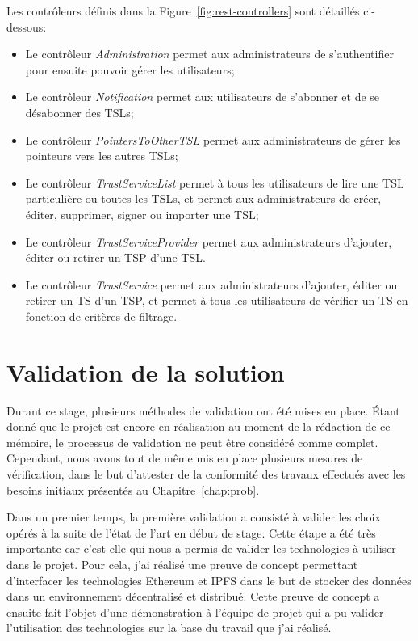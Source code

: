 \documentclass{tnreport}
\begin{document}
Les contrôleurs définis dans la Figure~\ref{fig:rest-controllers} sont détaillés ci-dessous:
\begin{itemize}
	\item Le contrôleur \textit{Administration} permet aux administrateurs de s'authentifier pour ensuite pouvoir gérer les utilisateurs;
	\item Le contrôleur \textit{Notification} permet aux utilisateurs de s'abonner et de se désabonner des TSLs;
	\item Le contrôleur \textit{PointersToOtherTSL} permet aux administrateurs de gérer les pointeurs vers les autres TSLs;
	\item Le contrôleur \textit{TrustServiceList} permet à tous les utilisateurs de lire une TSL particulière ou toutes les TSLs, et permet aux administrateurs de créer, éditer, supprimer, signer ou importer une TSL;
	\item Le contrôleur \textit{TrustServiceProvider} permet aux administrateurs d'ajouter, éditer ou retirer un TSP d'une TSL.
	\item Le contrôleur \textit{TrustService} permet aux administrateurs d'ajouter, éditer ou retirer un TS d'un TSP, et permet à tous les utilisateurs de vérifier un TS en fonction de critères de filtrage.
\end{itemize}

\section{Validation de la solution}

Durant ce stage, plusieurs méthodes de validation ont été mises en place. 
Étant donné que le projet est encore en réalisation au moment de la rédaction de ce mémoire, le processus de validation ne peut être considéré comme complet. Cependant, nous avons tout de même mis en place plusieurs mesures de vérification, dans le but d'attester de la conformité des travaux effectués avec les besoins initiaux présentés au Chapitre~\ref{chap:prob}.

Dans un premier temps, la première validation a consisté à valider les choix opérés à la suite de l'état de l'art en début de stage. Cette étape a été très importante car c'est elle qui nous a permis de valider les technologies à utiliser dans le projet. Pour cela, j'ai réalisé une preuve de concept permettant d'interfacer les technologies Ethereum et IPFS dans le but de stocker des données dans un environnement décentralisé et distribué. Cette preuve de concept a ensuite fait l'objet d'une démonstration à l'équipe de projet qui a pu valider l'utilisation des technologies sur la base du travail que j'ai réalisé.
\end{document}
